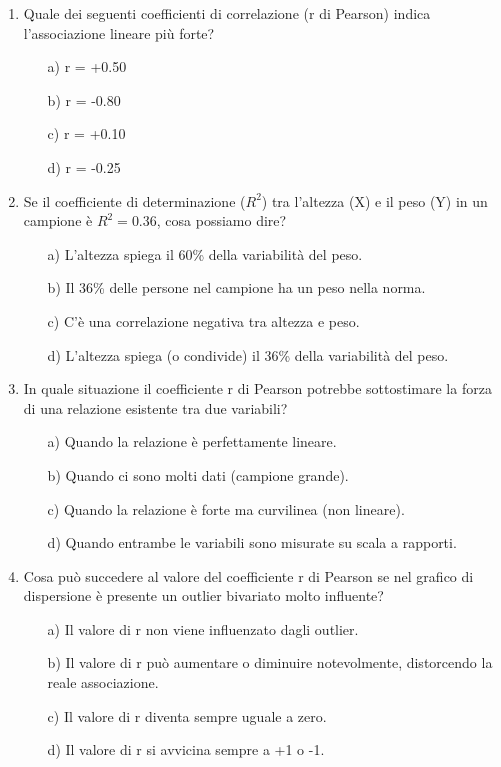 \documentclass[12pt, a4paper]{article}
\newcommand{\rsq}{R^2}
\begin{document}
\begin{enumerate}
\item Quale dei seguenti coefficienti di correlazione (r di Pearson) indica l'associazione lineare più forte?
\begin{itemize}
    \item[a)] r = +0.50
    \item[b)] r = -0.80
    \item[c)] r = +0.10
    \item[d)] r = -0.25
\end{itemize}
\vspace{0.3cm}

\item Se il coefficiente di determinazione ($\rsq$) tra l'altezza (X) e il peso (Y) in un campione è $\rsq = 0.36$, cosa possiamo dire?
\begin{itemize}
    \item[a)] L'altezza spiega il 60\% della variabilità del peso.
    \item[b)] Il 36\% delle persone nel campione ha un peso nella norma.
    \item[c)] C'è una correlazione negativa tra altezza e peso.
    \item[d)] L'altezza spiega (o condivide) il 36\% della variabilità del peso.
\end{itemize}
\vspace{0.3cm}

\item  In quale situazione il coefficiente r di Pearson potrebbe sottostimare la forza di una relazione esistente tra due variabili?
\begin{itemize}
    \item[a)] Quando la relazione è perfettamente lineare.
    \item[b)] Quando ci sono molti dati (campione grande).
    \item[c)] Quando la relazione è forte ma curvilinea (non lineare).
    \item[d)] Quando entrambe le variabili sono misurate su scala a rapporti.
\end{itemize}
\vspace{0.3cm}

\item  Cosa può succedere al valore del coefficiente r di Pearson se nel grafico di dispersione è presente un outlier bivariato molto influente?
\begin{itemize}
    \item[a)] Il valore di r non viene influenzato dagli outlier.
    \item[b)] Il valore di r può aumentare o diminuire notevolmente, distorcendo la reale associazione.
    \item[c)] Il valore di r diventa sempre uguale a zero.
    \item[d)] Il valore di r si avvicina sempre a +1 o -1.
\end{itemize}
\vspace{0.3cm}


\end{enumerate}
\end{document}
